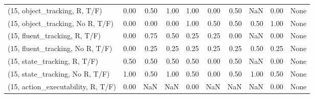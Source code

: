 \begin{table*}[h!]
\begin{adjustbox}{width=2\columnwidth,center}
\begin{tabular}{lrrr|rrr|rrr}
\midrule
(15, object\_tracking, R, T/F)         &                      0.00 &                  0.50 &                      1.00 &                          1.00 &                      0.00 &                          0.50 &                                    NaN &                               0.00 &                                  None \\
(15, object\_tracking, No R, T/F)      &                      0.00 &                  0.00 &                      0.00 &                          1.00 &                      0.50 &                          0.50 &                                   0.50 &                               1.00 &                                  None \\
(15, fluent\_tracking, R, T/F)         &                      0.00 &                  0.75 &                      0.50 &                          0.25 &                      0.25 &                          0.00 &                                    NaN &                               0.00 &                                  None \\
(15, fluent\_tracking, No R, T/F)      &                      0.00 &                  0.25 &                      0.25 &                          0.25 &                      0.25 &                          0.25 &                                   0.50 &                               0.25 &                                  None \\
(15, state\_tracking, R, T/F)          &                      0.50 &                  0.50 &                      0.50 &                          0.50 &                      0.00 &                          0.50 &                                    NaN &                               0.00 &                                  None \\
(15, state\_tracking, No R, T/F)       &                      1.00 &                  0.50 &                      1.00 &                          0.50 &                      0.00 &                          0.50 &                                   1.00 &                               0.50 &                                  None \\
(15, action\_executability, R, T/F)    &                      0.00 &                   NaN &                       NaN &                          0.00 &                       NaN &                           NaN &                                    NaN &                               0.00 &                                  None \\

\end{tabular}
\end{adjustbox}
\end{table*}
